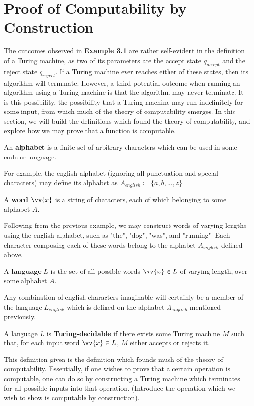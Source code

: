 \documentclass{article}
\begin{document}
\section{Proof of Computability by Construction}
The outcomes observed in \textbf{Example 3.1} are rather self-evident in the definition of a Turing machine, as two of its parameters are the accept state $q_{accept}$ and the reject state $q_{reject}$.  If a Turing machine ever reaches either of these states, then its algorithm will terminate.  However, a third potential outcome when running an algorithm using a Turing machine is that the algorithm may never terminate.  It is this possibility, the possibility that a Turing machine may run indefinitely for some input, from which much of the theory of computability emerges.  In this section, we will build the definitions which found the theory of computability, and explore how we may prove that a function is computable.
\begin{defin}
	An \textbf{alphabet} is a finite set of arbitrary characters which can be used in some code or language.
\end{defin}
\noindent For example, the english alphabet (ignoring all punctuation and special characters) may define its alphabet as $A_{english} \coloneq \{ a, b, ... , z \}$
\begin{defin}
	A \textbf{word} $\vv{x}$ is a string of characters, each of which belonging to some alphabet $A$.
\end{defin}
\noindent Following from the previous example, we may construct words of varying lengths using the english alphabet, such as "the", "dog", "was", and "running".  Each character composing each of these words belong to the alphabet $A_{english}$ defined above.
\begin{defin}
	A \textbf{language} $L$ is the set of all possible words $\vv{x} \in L$ of varying length, over some alphabet $A$.
\end{defin}
\noindent Any combination of english characters imaginable will certainly be a member of the language $L_{english}$ which is defined on the alphabet $A_{english}$ mentioned previously.
\begin{defin}
	A language $L$ is \textbf{Turing-decidable} if there exists some Turing machine $M$ such that, for each input word $\vv{x} \in L$, $M$ either accepts or rejects it.
\end{defin}
\noindent This definition given is the definition which founds much of the theory of computability.  Essentially, if one wishes to prove that a certain operation is computable, one can do so by constructing a Turing machine which terminates for all possible inputs into that operation.  (Introduce the operation which we wish to show is computable by construction).
\end{document}
